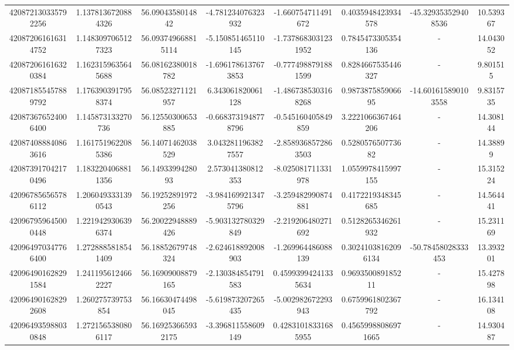\documentclass{article}
\begin{document}
\begin{landscape}
\begin{longtable}[c]{S[table-format=18.0]S[table-format=2.15]S[table-format=2.15]S[table-format=-2.17]S[table-format=-2.16]S[table-format=-2.16]S[table-format=-3.16]S[table-format=2.7]}
420872130335792256 & 1.1378136720884326 & 56.0904358014842   & -4.781234076323932   & -1.660754711491672     & 0.4035948423934578  & -45.329353529408536 & 10.539367  \\
420872061616314752 & 1.1483097065127323 & 56.093749668815114 & -5.150851465110145   & -1.7378683031231952    & 0.7845473305354136  & {-}                  & 14.043052  \\
420872061616320384 & 1.1623159635645688 & 56.08162380018782  & -1.6961786137673853  & -0.7774988791881599    & 0.8284667535446327  & {-}                  & 9.801515   \\
420871855457889792 & 1.1763903917958374 & 56.08523271121957  & 6.343061820061128    & -1.4867385303168268    & 0.987387585906695   & -14.601615890103558 & 9.8315735  \\
420873676524006400 & 1.145873133270736  & 56.12550300653885  & -0.6683731948778796  & -0.545160405849859     & 3.2221066367464206  & {-}                  & 14.308144  \\
420874088840863616 & 1.1617519622085386 & 56.14071462038529  & 3.0432811963827557   & -2.8589368572863503    & 0.528057650773682   & {-}                  & 14.38899   \\
420873917042170496 & 1.1832204068811356 & 56.1493399428093   & 2.573041380812353    & -8.025081711331978     & 1.0559978415997155  & {-}                  & 15.315224  \\
420967856565786112 & 1.2060493331390543 & 56.19252891972256  & -3.9841699213475796  & -3.259482990874881     & 0.4172219348345685  & {-}                  & 14.564441  \\
420967959645000448 & 1.2219429306396374 & 56.20022948889426  & -5.903132780329849   & -2.219206480271692     & 0.5128265346261932  & {-}                  & 15.231169  \\
420964970347766400 & 1.2728885818541409 & 56.18852679748324  & -2.624618892008903   & -1.269964486088139     & 0.30241038162096134 & -50.78458028333453  & 13.393201  \\
420964901628291584 & 1.2411956124662227 & 56.16909008879165  & -2.130384854791583   & 0.45993994241335634    & 0.969350089185211   & {-}                  & 15.427898  \\
420964901628292608 & 1.260275739753854  & 56.16630474498045  & -5.619873207265435   & -5.002982672293943     & 0.6759961802367792  & {-}                  & 16.134108  \\
420964935988030848 & 1.2721565380806117 & 56.169253665932175 & -3.396811558609149   & 0.42831018331685955    & 0.45659988086971665 & {-}                  & 14.930487  \\

\end{longtable}
\end{landscape}
\end{document}
